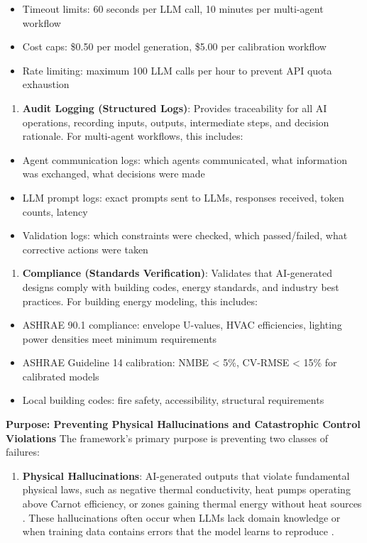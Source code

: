 \documentclass[12pt,a4paper]{article}
\begin{document}
\begin{itemize}
  \item Timeout limits: 60 seconds per LLM call, 10 minutes per multi-agent workflow
  \item Cost caps: \$0.50 per model generation, \$5.00 per calibration workflow
  \item Rate limiting: maximum 100 LLM calls per hour to prevent API quota exhaustion
\end{itemize}
\begin{enumerate}[resume]
  \item \textbf{Audit Logging (Structured Logs)}: Provides traceability for all AI operations, recording inputs, outputs, intermediate steps, and decision rationale. For multi-agent workflows, this includes:
\end{enumerate}
\begin{itemize}
  \item Agent communication logs: which agents communicated, what information was exchanged, what decisions were made
  \item LLM prompt logs: exact prompts sent to LLMs, responses received, token counts, latency
  \item Validation logs: which constraints were checked, which passed/failed, what corrective actions were taken
\end{itemize}
\begin{enumerate}[resume]
  \item \textbf{Compliance (Standards Verification)}: Validates that AI-generated designs comply with building codes, energy standards, and industry best practices. For building energy modeling, this includes:
\end{enumerate}
\begin{itemize}
  \item ASHRAE 90.1 compliance: envelope U-values, HVAC efficiencies, lighting power densities meet minimum requirements
  \item ASHRAE Guideline 14 calibration: NMBE < 5\%, CV-RMSE < 15\% for calibrated models \cite{ref36}
  \item Local building codes: fire safety, accessibility, structural requirements
\end{itemize}
\textbf{Purpose: Preventing Physical Hallucinations and Catastrophic Control Violations}
The framework's primary purpose is preventing two classes of failures:
\begin{enumerate}
  \item \textbf{Physical Hallucinations}: AI-generated outputs that violate fundamental physical laws, such as negative thermal conductivity, heat pumps operating above Carnot efficiency, or zones gaining thermal energy without heat sources \cite{ref56}. These hallucinations often occur when LLMs lack domain knowledge or when training data contains errors that the model learns to reproduce \cite{ref21}.
\end{enumerate}
\end{document}
